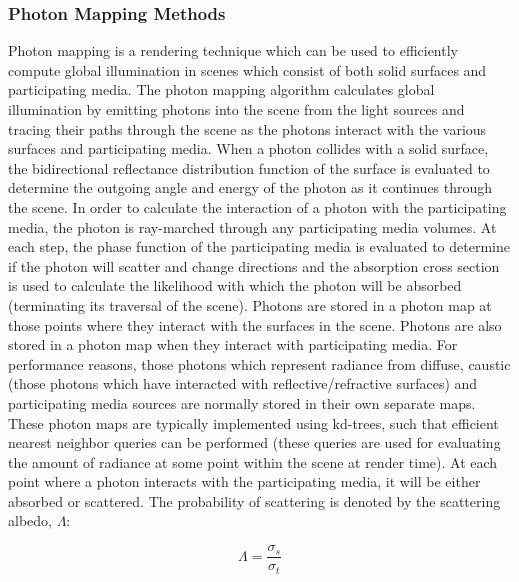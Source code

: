 \documentclass{article}
\begin{document}
\subsubsection{Photon Mapping Methods}

Photon mapping is a rendering technique which can be used to efficiently compute global illumination in scenes which consist of both solid surfaces and participating media. The photon mapping algorithm calculates global illumination by emitting photons into the scene from the light sources and tracing their paths through the scene as the photons interact with the various surfaces and participating media. When a photon collides with a solid surface, the bidirectional reflectance distribution function of the surface is evaluated to determine the outgoing angle and energy of the photon as it continues through the scene. In order to calculate the interaction of a photon with the participating media, the photon is ray-marched through any participating media volumes. At each step, the phase function of the participating media is evaluated to determine if the photon will scatter and change directions and the absorption cross section is used to calculate the likelihood with which the photon will be absorbed (terminating its traversal of the scene).
\newline \newline
Photons are stored in a photon map at those points where they interact with the surfaces in the scene. Photons are also stored in a photon map when they interact with participating media. For performance reasons, those photons which represent radiance from diffuse, caustic (those photons which have interacted with reflective/refractive surfaces) and participating media sources are normally stored in their own separate maps. These photon maps are typically implemented using kd-trees, such that efficient nearest neighbor queries can be performed (these queries are used for evaluating the amount of radiance at some point within the scene at render time). 
\newline \newline
At each point where a photon interacts with the participating media, it will be either absorbed or scattered. The probability of scattering is denoted by the scattering albedo, $\Lambda$:

\begin{equation}
\Lambda = \frac{\sigma_{s}}{\sigma_{t}}
\end{equation}
\end{document}
